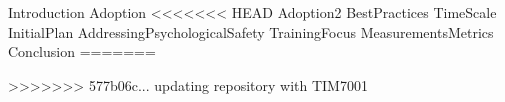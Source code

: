 \documentclass[unknownkeysallowed]{beamer}
\begin{document}

\begin{frame}
  \titlepage
\end{frame}

{Introduction}
{Adoption}
<<<<<<< HEAD
{Adoption2}
{BestPractices}
{TimeScale}
{InitialPlan}
{AddressingPsychologicalSafety}
{TrainingFocus}
{MeasurementsMetrics}
{Conclusion}
=======

>>>>>>> 577b06c... updating repository with TIM7001


\begin{frame}[allowframebreaks]

  \printbibliography

\end{frame}


\appendix
\end{document}
